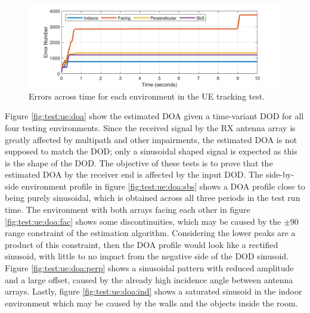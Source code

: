 \documentclass[12pt,a4paper]{report}
\begin{document}
\begin{figure}[h]
    \centering
    \includegraphics[width = \textwidth]{Figures/test_ue_errors.png}
    \caption{Errors across time for each environment in the UE tracking test.}
    \label{fig:test:ue:real:err}
\end{figure}

Figure \ref{fig:test:ue:doa} show the estimated DOA given a time-variant DOD for all four testing environments. Since the received signal by the RX antenna array is greatly affected by multipath and other impairments, the estimated DOA is not supposed to match the DOD; only a sinusoidal shaped signal is expected as this is the shape of the DOD. The objective of these tests is to prove that the estimated DOA by the receiver end is affected by the input DOD. The side-by-side environment profile in figure \ref{fig:test:ue:doa:sbs} shows a DOA profile close to being purely sinusoidal, which is obtained across all three periods in the test run time. The environment with both arrays facing each other in figure \ref{fig:test:ue:doa:fac} shows some discontinuities, which may be caused by the $\pm 90$ range constraint of the estimation algorithm. Considering the lower peaks are a product of this constraint, then the DOA profile would look like a rectified sinusoid, with little to no impact from the negative side of the DOD sinusoid. Figure \ref{fig:test:ue:doa:perp} shows a sinusoidal pattern with reduced amplitude and a large offset, caused by the already high incidence angle between antenna arrays. Lastly, figure \ref{fig:test:ue:doa:ind} shows a saturated sinusoid in the indoor environment which may be caused by the walls and the objects inside the room.
\end{document}

